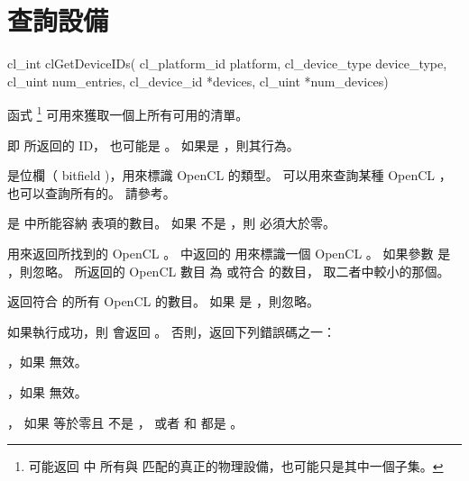 \section{查詢設備}

\startCLFUNC
cl_int clGetDeviceIDs(
		cl_platform_id platform,
		cl_device_type device_type,
		cl_uint num_entries,
		cl_device_id *devices,
		cl_uint *num_devices)
\stopCLFUNC

函式 \footnote{%
 可能返回  中
所有與  匹配的真正的物理設備，也可能只是其中一個子集。}
可用來獲取一個上所有可用的清單。

 即  所返回的 ID，
也可能是 。
如果是 ，則其行為。

 是位欄（ bitfield )，用來標識 OpenCL 的類型。
可以用來查詢某種 OpenCL ，也可以查詢所有的。
請參考。

{}

 是 中所能容納  表項的數目。
如果  不是 ，則  必須大於零。

 用來返回所找到的 OpenCL 。
 中返回的  用來標識一個 OpenCL 。
如果參數  是 ，則忽略。
所返回的 OpenCL 數目
為  或符合  的数目，
取二者中較小的那個。

 返回符合  的所有 OpenCL 的數目。
如果  是 ，則忽略。

如果執行成功，則  會返回 。
否則，返回下列錯誤碼之一：
\startigBase
\item {}，如果  無效。
\item {}，如果  無效。

\item {}，
如果  等於零且  不是 ，
或者  和  都是 。

